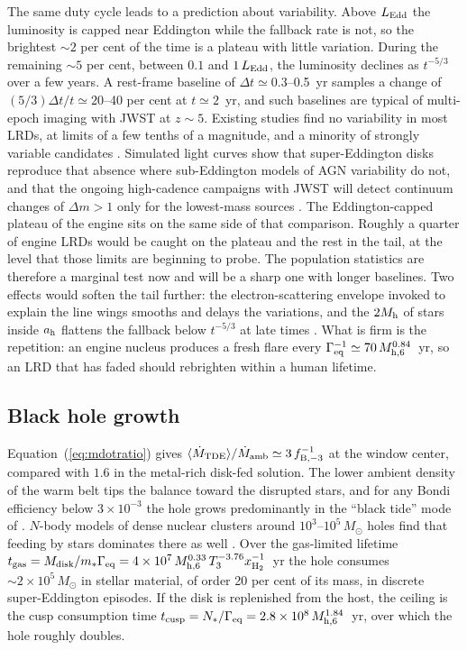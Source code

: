 \documentclass[twocolumn,pdftex]{aastex701}
\newcommand{\msun}{M_{\odot}}
\newcommand{\Mh}{M_{\rm h}}
\newcommand{\mhsix}{M_{\rm h,6}}
\newcommand{\Tthree}{T_{3}}
\newcommand{\xhh}{x_{\rm H_2}}
\newcommand{\Geq}{\Gamma_{\rm eq}}
\begin{document}
The same duty cycle leads to a prediction about variability. Above $L_{\rm Edd}$ the luminosity is capped near Eddington while the fallback rate is not, so the brightest $\sim2$ per cent of the time is a plateau with little variation. During the remaining $\sim5$ per cent, between $0.1$ and $1\,L_{\rm Edd}$, the luminosity declines as $t^{-5/3}$ over a few years. A rest-frame baseline of $\Delta t\simeq0.3$--0.5~yr samples a change of $(5/3)\Delta t/t\simeq20$--40 per cent at $t\simeq2$~yr, and such baselines are typical of multi-epoch imaging with JWST at $z\sim5$. Existing studies find no variability in most LRDs, at limits of a few tenths of a magnitude, and a minority of strongly variable candidates \citep{Kokubo:2025a,Tee:2025a,Zhang:2025a}. Simulated light curves show that super-Eddington disks reproduce that absence where sub-Eddington models of AGN variability do not, and that the ongoing high-cadence campaigns with JWST will detect continuum changes of $\Delta m>1$ only for the lowest-mass sources \citep{Secunda:2026a}. The Eddington-capped plateau of the engine sits on the same side of that comparison. Roughly a quarter of engine LRDs would be caught on the plateau and the rest in the tail, at the level that those limits are beginning to probe. The population statistics are therefore a marginal test now and will be a sharp one with longer baselines. Two effects would soften the tail further: the electron-scattering envelope invoked to explain the line wings \citep{Rusakov:2026a} smooths and delays the variations, and the $2\Mh$ of stars inside $a_{\rm h}$ flattens the fallback below $t^{-5/3}$ at late times \citep{Ona:2025a}. What is firm is the repetition: an engine nucleus produces a fresh flare every $\Geq^{-1}\simeq70\,\mhsix^{0.84}$~yr, so an LRD that has faded should rebrighten within a human lifetime.

\subsection{Black hole growth}\label{sec:growth}

Equation~(\ref{eq:mdotratio}) gives $\langle\dot M_{\rm TDE}\rangle/\dot M_{\rm amb}\simeq3\,f_{\rm B,-3}^{-1}$ at the window center, compared with $1.6$ in the metal-rich disk-fed solution. The lower ambient density of the warm belt tips the balance toward the disrupted stars, and for any Bondi efficiency below $3\times10^{-3}$ the hole grows predominantly in the ``black tide'' mode of \citet{Young:1977a}. $N$-body models of dense nuclear clusters around $10^{3}$--$10^{5}\,\msun$ holes find that feeding by stars dominates there as well \citep{Kritos:2026b,Wang:2026b}. Over the gas-limited lifetime $t_{\rm gas} = M_{\rm disk}/m_\ast\Geq = 4\times10^{7}\,\mhsix^{0.33}\,\Tthree^{-3.76}\xhh^{-1}$~yr the hole consumes $\sim2\times10^{5}\,\msun$ in stellar material, of order 20 per cent of its mass, in discrete super-Eddington episodes. If the disk is replenished from the host, the ceiling is the cusp consumption time $t_{\rm cusp} = N_\ast/\Geq = 2.8\times10^{8}\,\mhsix^{1.84}$~yr, over which the hole roughly doubles.
\end{document}
